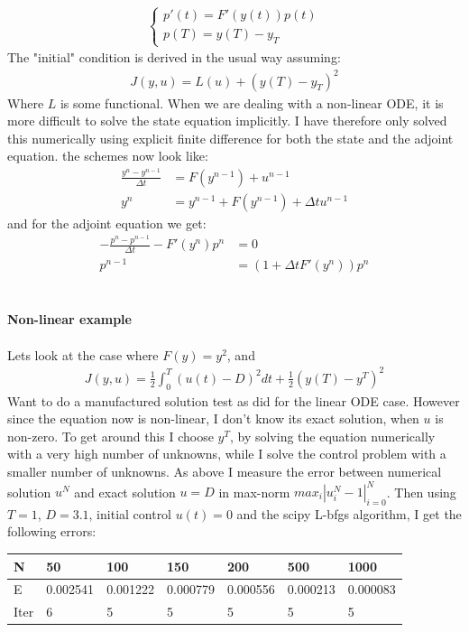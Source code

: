 \documentclass[11pt,a4paper]{article}
\begin{document}
\begin{align*}
\left\{
     \begin{array}{lr}
       	p'(t)=F'(y(t))p(t)\\
       	   p(T)= y(T)-y_T
     \end{array}
   \right.
\end{align*}
The "initial" condition is derived in the usual way assuming: 
\begin{align*}
J(y,u)=L(u) + (y(T)-y_T)^2
\end{align*}
Where $L$ is some functional. When we are dealing with a non-linear ODE, it is more difficult to solve the state equation implicitly. I have therefore only solved this numerically using explicit finite difference for both the state and the adjoint equation. the schemes now look like: 
  \begin{align*}
\frac{y^n-y^{n-1}}{\Delta t} &= F(y^{n-1}) + u^{n-1}\\
y^{n} &= y^{n-1} +F(y^{n-1})+\Delta t u^{n-1} 
\end{align*} 
and for the adjoint equation we get:
\begin{align*}
-\frac{p^n-p^{n-1}}{\Delta t} -F'(y^{n})p^n &=0 \\
p^{n-1} &= (1+\Delta t F'(y^{n}))p^n
\end{align*} 
\\
\\
\textbf{Non-linear example}
\\
\\
Lets look at the case where $F(y) = y^2$, and \begin{align*}
J(y,u) = \frac{1}{2}\int_0^T(u(t)-D)^2dt + \frac{1}{2}(y(T)-y^T)^2
\end{align*}
Want to do a manufactured solution test as did for the  linear ODE case. However since the equation now is non-linear, I don't know its exact solution, when $u$ is non-zero. To get around this I choose $y^T$, by solving the equation numerically with a very high number of unknowns, while I solve the control problem with a smaller number of unknowns. As above I measure the error between numerical solution $u^N$ and exact solution $u=D$ in max-norm $max_i{|u^N_i-1|}_{i=0}^N$. Then using $T=1$, $D=3.1$, initial control $u(t)=0$ and the scipy L-bfgs algorithm, I get the following errors:
\begin{center}
    \begin{tabular}{| l | l | l | l | l | l | l |}
    \hline
    N & 50 & 100  & 150 & 200 & 500 & 1000 \\ \hline
    E & 0.002541 & 0.001222 &0.000779 & 0.000556 & 0.000213 & 0.000083	\\ \hline
    Iter & 6 & 5  & 5 & 5 & 5 & 5 \\ \hline
    \end{tabular}
\end{center}
\end{document}
